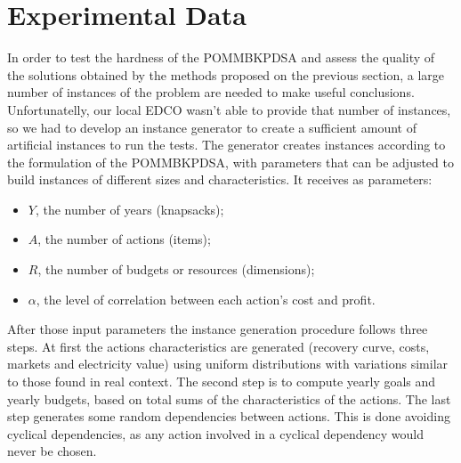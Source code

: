 \section{Experimental Data}
\label{sec:exp_data}

In order to test the hardness of the POMMBKPDSA and assess the quality of the solutions obtained by the methods 
proposed on the previous section, a large number of instances of the problem are needed to make useful 
conclusions. Unfortunatelly, our local EDCO wasn't able to provide that number of instances, so we had 
to develop an instance generator to create a sufficient amount of artificial instances to run the tests. 
The generator creates instances according to the formulation of the POMMBKPDSA, with parameters that can be 
adjusted to build instances of different sizes and characteristics. It receives as parameters:
\begin{itemize}
  \item $Y$, the number of years (knapsacks);
  \item $A$, the number of actions (items);
  \item $R$, the number of budgets or resources (dimensions);
  \item $\alpha$, the level of correlation between each action's cost and profit.
\end{itemize}
After those input parameters the instance generation procedure follows three steps.
At first the actions characteristics are generated (recovery curve, costs, markets and electricity value)
using uniform distributions with variations similar to those found in real context.
The second step is to compute yearly goals and yearly budgets,
based on total sums of the characteristics of the actions.
The last step generates some random dependencies between actions.
This is done avoiding cyclical dependencies, as any action involved in a cyclical 
dependency would never be chosen.



